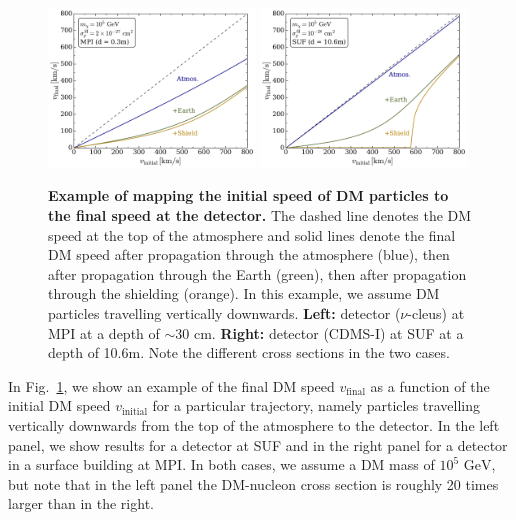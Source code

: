 \documentclass[prd,twocolumn,showpacs,nofootinbib,aps]{revtex4-1}
\newcommand{\Bradley}[1]{\textcolor{red}{\textbf{BJK:} #1}}
\begin{document}
\begin{figure}[t]
\centering
\includegraphics[width=0.49\textwidth,]{plots/VelocityTransfer_nucleus.pdf}
\includegraphics[width=0.49\textwidth,]{plots/VelocityTransfer_CDMS.pdf}
\caption{\textbf{Example of mapping the initial speed of DM particles to the final speed at the detector.} The dashed line denotes the DM speed at the top of the atmosphere and solid lines denote the final DM speed after propagation through the atmosphere (blue), then after propagation through the Earth (green), then after propagation through the shielding (orange). In this example, we assume DM particles travelling vertically downwards. \textbf{Left:} detector ($\nu$-cleus) at MPI at a depth of $\sim 30$ cm. \textbf{Right:} detector  (CDMS-I) at SUF at a depth of 10.6m. Note the different cross sections in the two cases.}
\label{fig:VelocityTransfer}
\end{figure}


In Fig.~\ref{fig:VelocityTransfer}, we show an example of the final DM speed $v_\mathrm{final}$ as a function of the initial DM speed $v_\mathrm{initial}$ for a particular trajectory, namely particles travelling vertically downwards from the top of the atmosphere to the detector. In the left panel, we show results for a detector at SUF and in the right panel for a detector in a surface building at MPI. In both cases, we assume a DM mass of $10^5\,\, \mathrm{GeV}$, but note that in the left panel the DM-nucleon cross section is roughly 20 times larger than in the right.
\end{document}
